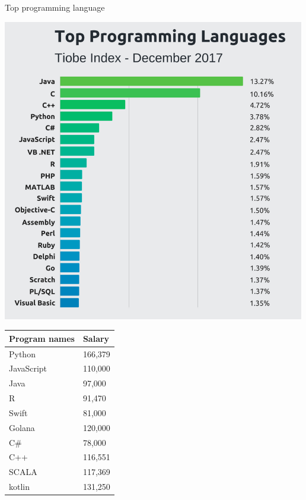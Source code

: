 \documentclass[
  ignorenonframetext,
]{beamer}
\begin{document}
\begin{frame}{Top programming language}
\protect\hypertarget{top-programming-language}{}

\includegraphics[width=500px]{Picture5}

\begin{longtable}[]{@{}ll@{}}
\toprule
Program names & Salary\tabularnewline
\midrule
\endhead
Python & 166,379\tabularnewline
JavaScript & 110,000\tabularnewline
Java & 97,000\tabularnewline
R & 91,470\tabularnewline
Swift & 81,000\tabularnewline
Golana & 120,000\tabularnewline
C\# & 78,000\tabularnewline
C++ & 116,551\tabularnewline
SCALA & 117,369\tabularnewline
kotlin & 131,250\tabularnewline
\bottomrule
\end{longtable}

\end{frame}
\end{document}
